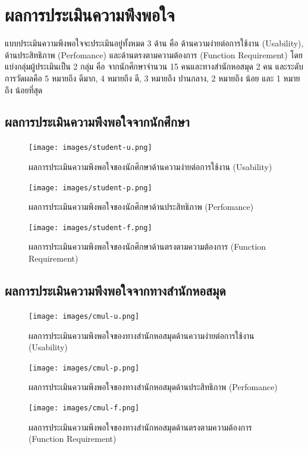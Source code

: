 \section{ผลการประเมินความพึงพอใจ}
แบบประเมินความพึงพอใจจะประเมินอยู่ทั้งหมด 3 ด้าน คือ ด้านความง่ายต่อการใช้งาน (Usability), ด้านประสิทธิภาพ (Perfomance) และด้านตรงตามความต้องการ (Function Requirement) โดยแบ่งกลุ่มผู้ประเมินเป็น 2 กลุ่ม คือ จากนักศึกษาจำนวน 15 คนและทางสำนักหอสมุด 2 คน 
และระดับการวัดผลคือ 5 หมายถึง ดีมาก, 4 หมายถึง ดี, 3 หมายถึง ปานกลาง, 2 หมายถึง น้อย และ 1 หมายถึง น้อยที่สุด
\subsection{ผลการประเมินความพึงพอใจจากนักศึกษา}
\begin{figure}[ht]
    \centering
    \texttt{[image: images/student-u.png]}
    \caption[st-u]{ผลการประเมินความพึงพอใจของนักศึกษาด้านความง่ายต่อการใช้งาน (Usability)}
    \label{fig:st-u}
\end{figure}
\newpage
\begin{figure}[ht]
    \centering
    \texttt{[image: images/student-p.png]}
    \caption[st-p]{ผลการประเมินความพึงพอใจของนักศึกษาด้านประสิทธิภาพ (Perfomance)}
    \label{fig:st-p}
\end{figure}
\begin{figure}[ht]
    \centering
    \texttt{[image: images/student-f.png]}
    \caption[st-f]{ผลการประเมินความพึงพอใจของนักศึกษาด้านตรงตามความต้องการ (Function Requirement)}
    \label{fig:st-f}
\end{figure}

\newpage
\subsection{ผลการประเมินความพึงพอใจจากทางสำนักหอสมุด}
\begin{figure}[ht]
    \centering
    \texttt{[image: images/cmul-u.png]}
    \caption[cmul-u]{ผลการประเมินความพึงพอใจของทางสำนักหอสมุดด้านความง่ายต่อการใช้งาน (Usability)}
    \label{fig:cmul-u}
\end{figure}
\begin{figure}[ht]
    \centering
    \texttt{[image: images/cmul-p.png]}
    \caption[cmul-p]{ผลการประเมินความพึงพอใจของทางสำนักหอสมุดด้านประสิทธิภาพ (Perfomance)}
    \label{fig:cmul-p}
\end{figure}
\newpage
\begin{figure}[ht]
    \centering
    \texttt{[image: images/cmul-f.png]}
    \caption[cmul-f]{ผลการประเมินความพึงพอใจของทางสำนักหอสมุดด้านตรงตามความต้องการ (Function Requirement)}
    \label{fig:cmul-f}
\end{figure}

